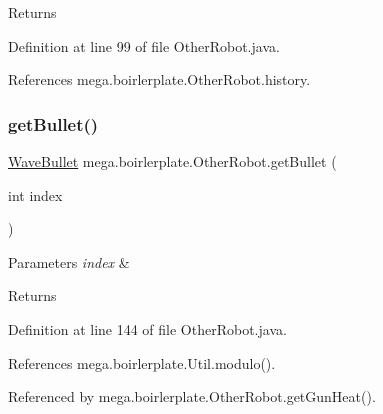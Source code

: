 \begin{DoxyReturn}{Returns}

\end{DoxyReturn}


Definition at line 99 of file Other\+Robot.\+java.



References mega.\+boirlerplate.\+Other\+Robot.\+history.

\mbox{\label{classmega_1_1boirlerplate_1_1_other_robot_ae6bc50add089f4020e8e21cc771a5d53}} 
\subsubsection{\texorpdfstring{get\+Bullet()}{getBullet()}}
{\footnotesize\ttfamily \hyperlink{classmega_1_1boirlerplate_1_1_wave_bullet}{Wave\+Bullet} mega.\+boirlerplate.\+Other\+Robot.\+get\+Bullet (\begin{DoxyParamCaption}\item[{int}]{index }\end{DoxyParamCaption})}


\begin{DoxyParams}{Parameters}
{\em index} & \\
\hline
\end{DoxyParams}
\begin{DoxyReturn}{Returns}

\end{DoxyReturn}


Definition at line 144 of file Other\+Robot.\+java.



References mega.\+boirlerplate.\+Util.\+modulo().



Referenced by mega.\+boirlerplate.\+Other\+Robot.\+get\+Gun\+Heat().

\mbox{\label{classmega_1_1boirlerplate_1_1_other_robot_aaee402de2957910ecb3cdb73261b1178}} 
